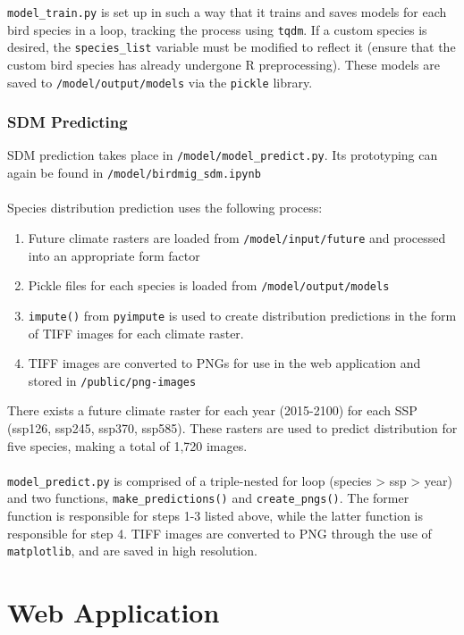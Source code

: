 \documentclass{article}
\begin{document}
\noindent \texttt{model\_train.py} is set up in such a way that it trains and saves models for each bird species in a loop, tracking the process using \texttt{tqdm}. If a custom species is desired, the \texttt{species\_list} variable must be modified to reflect it (ensure that the custom bird species has already undergone R preprocessing). These models are saved to \texttt{/model/output/models} via the \texttt{pickle} library.

\subsubsection{SDM Predicting}

SDM prediction takes place in \texttt{/model/model\_predict.py}. Its prototyping can again be found in \texttt{/model/birdmig\_sdm.ipynb}
\\\\
Species distribution prediction uses the following process:
\begin{enumerate}
	\item Future climate rasters are loaded from \texttt{/model/input/future} and processed into an appropriate form factor
	\item Pickle files for each species is loaded from \texttt{/model/output/models}
	\item \texttt{impute()} from \texttt{pyimpute} is used to create distribution predictions in the form of TIFF images for each climate raster.
	\item TIFF images are converted to PNGs for use in the web application and stored in \texttt{/public/png-images}
\end{enumerate}

\noindent There exists a future climate raster for each year (2015-2100) for each SSP (ssp126, ssp245, ssp370, ssp585). These rasters are used to predict distribution for five species, making a total of 1,720 images.
\\\\
\texttt{model\_predict.py} is comprised of a triple-nested for loop (species > ssp > year) and two functions, \texttt{make\_predictions()} and \texttt{create\_pngs()}. The former function is responsible for steps 1-3 listed above, while the latter function is responsible for step 4. TIFF images are converted to PNG through the use of \texttt{matplotlib}, and are saved in high resolution.

\section{Web Application}
\end{document}
